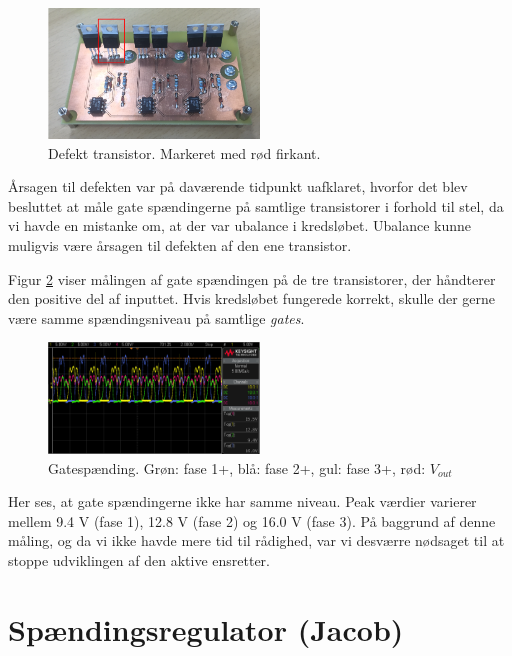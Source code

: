 \begin{figure}[h]
  \centering
  \includegraphics[width=0.5\textwidth]{./figurer/nt8.png}
  \caption{Defekt transistor. Markeret med rød firkant.}
  \label{fig:nt8}
\end{figure}

Årsagen til defekten var på daværende tidpunkt uafklaret, hvorfor det blev besluttet at måle gate spændingerne på samtlige transistorer i forhold til stel, da vi havde en mistanke om, at der var ubalance i kredsløbet. Ubalance kunne muligvis være årsagen til defekten af den ene transistor. 

Figur \ref{fig:nt9} viser målingen af gate spændingen på de tre transistorer, der håndterer den positive del af inputtet. Hvis kredsløbet fungerede korrekt, skulle der gerne være samme spændingsniveau på samtlige \textit{gates}. 

\begin{figure}[h]
  \centering
  \includegraphics[width=0.5\textwidth]{./figurer/nt9.png}
  \caption{Gatespænding. Grøn: fase 1+, blå: fase 2+, gul: fase 3+, rød: $V_{out}$}
  \label{fig:nt9}
\end{figure}

Her ses, at gate spændingerne ikke har samme niveau. Peak værdier varierer mellem 9.4 V (fase 1), 12.8 V (fase 2) og 16.0 V (fase 3). På baggrund af denne måling, og da vi ikke havde mere tid til rådighed, var vi desværre nødsaget til at stoppe udviklingen af den aktive ensretter. 


\section{Spændingsregulator (Jacob)}
\label{sec:spand-jacob}

